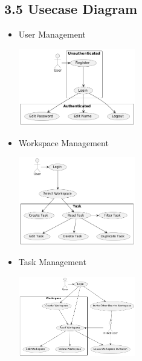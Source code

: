 \subsection*{3.5 Usecase Diagram}
\begin{itemize}
  \item User Management
  \newline
  \begin{center}
    \includegraphics[width=0.4\textwidth]{assets/usecase_diagrams/auth.png}
  \end{center}
  \item Workspace Management
  \newline
  \begin{center}
    \includegraphics[width=0.4\textwidth]{assets/usecase_diagrams/workspace.png}
  \end{center}
  \item Task Management
  \newline
  \begin{center}
    \includegraphics[width=0.4\textwidth]{assets/usecase_diagrams/task.png}
  \end{center}
\end{itemize}


